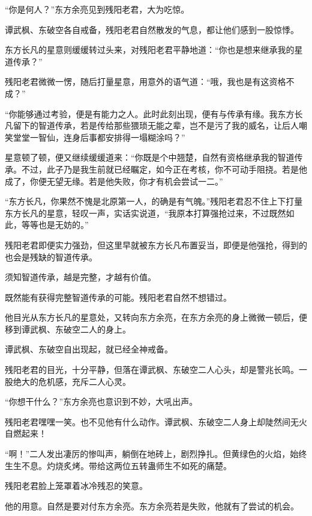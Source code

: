 
\begin{this_body}

“你是何人？”东方余亮见到残阳老君，大为吃惊。

谭武枫、东破空各自戒备，残阳老君自然散发的气息，都让他们感到一股惊悸。

东方长凡的星意则缓缓转过头来，对残阳老君平静地道：“你也是想来继承我的星道传承？”

残阳老君微微一愣，随后打量星意，用意外的语气道：“哦，我也是有这资格不成？”

“你能够通过考验，便是有能力之人。此时此刻出现，便有与传承有缘。我东方长凡留下的智道传承，若是传给那些猥琐无能之辈，岂不是污了我的威名，让后人嘲笑堂堂一智仙，连身后事都安排得一塌糊涂吗？”

星意顿了顿，便又继续缓缓道来：“你既是个中翘楚，自然有资格继承我的智道传承。不过，此子乃是我生前就已经瞩定，如今正在考核，你不可动手阻挠。若是他成了，你便无望无缘。若是他失败，你才有机会尝试一二。”

“东方长凡，你果然不愧是北原第一人，的确是有气魄。”残阳老君忍不住上下打量东方长凡的星意，轻叹一声，实话实说道，“我原本打算强抢过来，不过既然如此，等等也是无妨的。”

残阳老君即便实力强劲，但这里早就被东方长凡布置妥当，即便是他强抢，得到的也会是残缺的智道传承。

须知智道传承，越是完整，才越有价值。

既然能有获得完整智道传承的可能。残阳老君自然不想错过。

他目光从东方长凡的星意处，又转向东方余亮，在东方余亮的身上微微一顿后，便移到谭武枫、东破空二人的身上。

谭武枫、东破空自出现起，就已经全神戒备。

残阳老君的目光，十分平静，但落在谭武枫、东破空二人心头，却是警兆长鸣。一股绝大的危机感，充斥二人心灵。

“你想干什么？”东方余亮也意识到不妙，大吼出声。

残阳老君嘿嘿一笑。也不见他有什么动作。谭武枫、东破空二人身上却陡然间无火自燃起来！

“啊！”二人发出凄厉的惨叫声，躺倒在地砖上，剧烈挣扎。但黄绿色的火焰，始终生生不息。灼烧炙烤。带给这两位五转蛊师生不如死的痛楚。

残阳老君脸上笼罩着冰冷残忍的笑意。

他的用意。自然是要对付东方余亮。东方余亮若是失败，他就有了尝试的机会。


\end{this_body}
